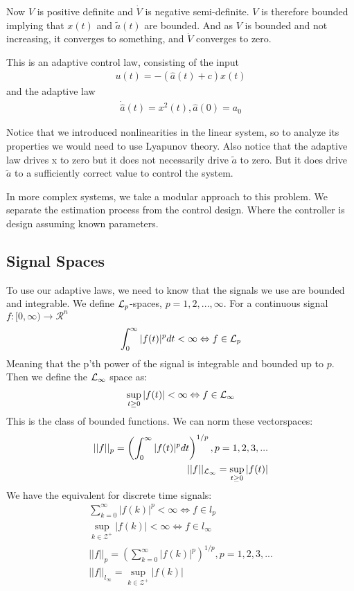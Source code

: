 Now $V$ is positive definite and $\dot{V}$ is negative semi-definite.
$V$ is therefore bounded implying that $x(t)$ and $\tilde{a}(t)$ are bounded.
And as $V$ is bounded and not increasing, it converges to something, and $\dot{V}$ converges to zero. 

This is an adaptive control law, consisting of the input 
\begin{align}
    u(t) = -(\hat{a} (t) + c)x(t)
\end{align}
and the adaptive law 
\begin{align}
    \dot{\hat{a}}(t) = x^2 (t), \hat{a}(0) = a_0
\end{align}

Notice that we introduced nonlinearities in the linear system, so to analyze its properties 
we would need to use Lyapunov theory. Also notice that the adaptive law drives x to zero but it does not necessarily drive 
$\tilde{a}$ to zero. But it does drive $\tilde{a}$ to a sufficiently correct value to control the system.

In more complex systems, we take a modular approach to this problem. We separate the estimation process 
from the control design. Where the controller is design assuming known parameters. 


\subsection*{Signal Spaces}
To use our adaptive laws, we need to know that the signals we use are bounded and integrable.
We define $\mathcal{L}_p$-spaces, $p = 1,2,...,\infty$.
For a continuous signal $f: [0, \infty) \rightarrow \mathcal{R}^n$
\begin{align}
    \int_{0}^{{\infty}} |f(t)|^p dt < \infty \Leftrightarrow f \in \mathcal{L}_p
\end{align}
Meaning that the p'th power of the signal is integrable and bounded up to $p$. 
Then we define the $\mathcal{L}_{\infty}$ space as:
\begin{align}
    \sup_{t \geq 0} |f(t)| < \infty \Leftrightarrow f \in \mathcal{L}_{\infty}
\end{align}
This is the class of bounded functions. 
We can norm these vectorspaces: 
\begin{align}
    ||f||_p = \left( \int_{0}^{\infty} |f(t)|^p dt \right)^{1/p}, p = 1,2,3,... \\
    ||f||_{\mathcal{L}_\infty} = \sup_{t \geq 0} |f(t)|
\end{align}
We have the equivalent for discrete time signals: 
\begin{align}
    \sum_{k=0}^{\infty} |f(k)|^p < \infty \Leftrightarrow f \in l_p \\
    \sup_{k \in \mathcal{Z}^+} |f(k)| < \infty \Leftrightarrow f \in l_{\infty} \\
    ||f||_p = \left( \sum_{k=0}^{\infty} |f(k)|^p \right)^{1/p}, p = 1,2,3,... \\
    ||f||_{l_\infty} = \sup_{k \in \mathcal{Z}^+} |f(k)|
\end{align}